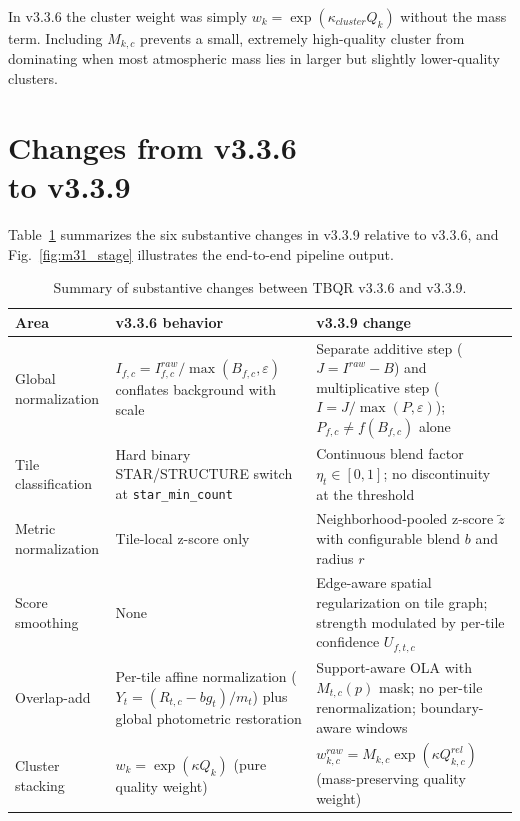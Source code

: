 \documentclass[10pt,twocolumn]{article}
\begin{document}
In v3.3.6 the cluster weight was simply $w_k=\exp(\kappa_{cluster}Q_k)$ without the mass term.
Including $M_{k,c}$ prevents a small, extremely high-quality cluster from dominating when most
atmospheric mass lies in larger but slightly lower-quality clusters.

\section{Changes from v3.3.6 \protect \\to v3.3.9}

Table~\ref{tab:changes} summarizes the six substantive changes in v3.3.9 relative to v3.3.6,
and Fig.~\ref{fig:m31_stage} illustrates the end-to-end pipeline output.

\begin{table}[t]
\centering
\caption{Summary of substantive changes between TBQR v3.3.6 and v3.3.9.}
\begin{tabularx}{\textwidth}{>{\raggedright\arraybackslash}p{} >{\raggedright\arraybackslash}p{} X}
\toprule
\textbf{Area} & \textbf{v3.3.6 behavior} & \textbf{v3.3.9 change} \\
\midrule
Global normalization &
$I_{f,c}=I_{f,c}^{raw}/\max(B_{f,c},\varepsilon)$ conflates background with scale &
Separate additive step ($J=I^{raw}-B$) and multiplicative step ($I=J/\max(P,\varepsilon)$); $P_{f,c}\ne f(B_{f,c})$ alone \\
\addlinespace
Tile classification &
Hard binary STAR/STRUCTURE switch at \texttt{star\_min\_count} &
Continuous blend factor $\eta_t\in[0,1]$; no discontinuity at the threshold \\
\addlinespace
Metric normalization &
Tile-local z-score only &
Neighborhood-pooled z-score $\tilde{z}$ with configurable blend $b$ and radius $r$ \\
\addlinespace
Score smoothing &
None &
Edge-aware spatial regularization on tile graph; strength modulated by per-tile confidence $U_{f,t,c}$ \\
\addlinespace
Overlap-add &
Per-tile affine normalization ($Y_t=(R_{t,c}-bg_t)/m_t$) plus global photometric restoration &
Support-aware OLA with $M_{t,c}(p)$ mask; no per-tile renormalization; boundary-aware windows \\
\addlinespace
Cluster stacking &
$w_k=\exp(\kappa Q_k)$ (pure quality weight) &
$w_{k,c}^{raw}=M_{k,c}\exp(\kappa Q_{k,c}^{rel})$ (mass-preserving quality weight) \\
\bottomrule
\end{tabularx}
\label{tab:changes}
\end{table}
\end{document}
